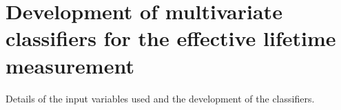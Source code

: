 \chapter{Development of multivariate classifiers for the \bsmumu effective lifetime measurement}

Details of the input variables used and the development of the classifiers.
